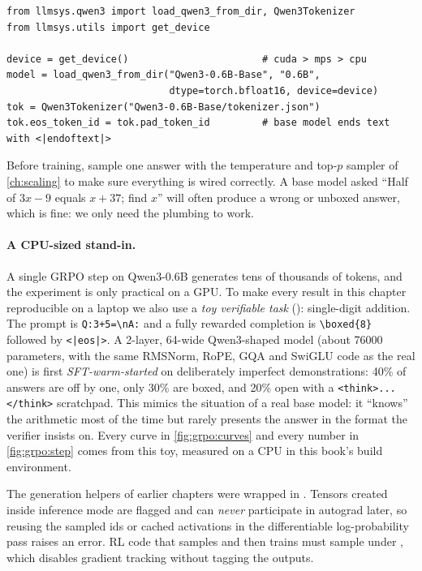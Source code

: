\begin{lstlisting}[caption={Loading the base policy and its tokenizer (real-hardware path of \texttt{run.py}).},label={lst:grpo:load}]
from llmsys.qwen3 import load_qwen3_from_dir, Qwen3Tokenizer
from llmsys.utils import get_device

device = get_device()                       # cuda > mps > cpu
model = load_qwen3_from_dir("Qwen3-0.6B-Base", "0.6B",
                            dtype=torch.bfloat16, device=device)
tok = Qwen3Tokenizer("Qwen3-0.6B-Base/tokenizer.json")
tok.eos_token_id = tok.pad_token_id         # base model ends text with <|endoftext|>
\end{lstlisting}

Before training, sample one answer with the temperature and top-$p$ sampler of
\cref{ch:scaling} to make sure everything is wired correctly. A base model asked
``Half of $3x-9$ equals $x+37$; find $x$'' will often produce a wrong or unboxed answer,
which is fine: we only need the plumbing to work.

\paragraph{A CPU-sized stand-in.} A single GRPO step on Qwen3-0.6B generates tens of
thousands of tokens, and the experiment is only practical on a GPU. To make every result in
this chapter reproducible on a laptop we also use a \emph{toy verifiable task}
(): single-digit addition. The prompt is \verb|Q:3+5=\nA:| and a
fully rewarded completion is \verb|\boxed{8}| followed by \verb|<|\verb+|eos|>+. A 2-layer,
64-wide Qwen3-shaped model (about \num{76000} parameters, with the same RMSNorm, RoPE, GQA
and SwiGLU code as the real one) is first \emph{SFT-warm-started} on deliberately
imperfect demonstrations: 40\% of answers are off by one, only 30\% are boxed, and 20\%
open with a \verb|<think>...</think>| scratchpad. This mimics the situation of a real base
model: it ``knows'' the arithmetic most of the time but rarely presents the answer in the
format the verifier insists on. Every curve in \cref{fig:grpo:curves} and every number in
\cref{fig:grpo:step} comes from this toy, measured on a CPU in this book's build
environment.

\begin{pitfall}
The generation helpers of earlier chapters were wrapped in
. Tensors created inside inference mode are flagged and can
\emph{never} participate in autograd later, so reusing the sampled ids or cached
activations in the differentiable log-probability pass raises an error. RL code that
samples and then trains must sample under , which disables
gradient tracking without tagging the outputs.
\end{pitfall}

